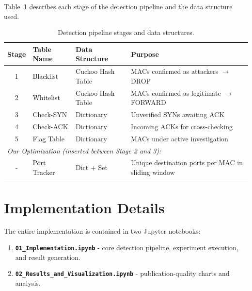 \documentclass[12pt, a4paper]{article}
\begin{document}
Table~\ref{tab:pipeline} describes each stage of the detection pipeline and the data structure used.

\begin{table}[H]
    \centering
    \caption{Detection pipeline stages and data structures.}
    \label{tab:pipeline}
    \renewcommand{\arraystretch}{1.3}
    \begin{tabularx}{\textwidth}{clXX}
        \toprule
        \textbf{Stage} & \textbf{Table Name} & \textbf{Data Structure} & \textbf{Purpose} \\
        \midrule
        1 & Blacklist  & Cuckoo Hash Table & MACs confirmed as attackers $\rightarrow$ DROP \\
        2 & Whitelist  & Cuckoo Hash Table & MACs confirmed as legitimate $\rightarrow$ FORWARD \\
        3 & Check-SYN  & Dictionary        & Unverified SYNs awaiting ACK \\
        4 & Check-ACK  & Dictionary        & Incoming ACKs for cross-checking \\
        5 & Flag Table & Dictionary        & MACs under active investigation \\
        \midrule
        \multicolumn{4}{l}{\textit{Our Optimization (inserted between Stage 2 and 3):}} \\
        - & Port Tracker & Dict + Set & Unique destination ports per MAC in sliding window \\
        \bottomrule
    \end{tabularx}
\end{table}

\newpage

\section{Implementation Details}

The entire implementation is contained in two Jupyter notebooks:
\begin{enumerate}[itemsep=3pt]
    \item \textbf{\texttt{01\_Implementation.ipynb}} - core detection pipeline, experiment execution, and result generation.
    \item \textbf{\texttt{02\_Results\_and\_Visualization.ipynb}} - publication-quality charts and analysis.
\end{enumerate}
\end{document}
